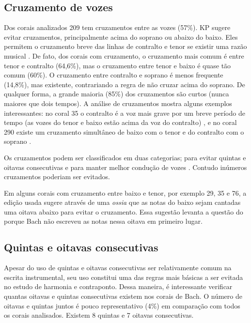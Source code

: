 \subsection{Cruzamento de vozes}
\label{sec:cruzamento-de-vozes}

Dos corais analizados 209 tem cruzamentos entre as vozes (57\%). KP
sugere evitar cruzamentos, principalmente acima do soprano ou abaixo
do baixo. Eles permitem o cruzamento breve das linhas de contralto e
tenor se existir uma razão musical \cite[p. 79]{kostka.ea00:tonal}. De
fato, dos corais com cruzamento, o cruzamento mais comum é entre tenor
e contralto (64,6\%), mas o cruzamento entre tenor e baixo é quase tão
comum (60\%). O cruzamento entre contralto e soprano é menos frequente
(14,8\%), mas existente, contrariando a regra de não cruzar acima do
soprano. De qualquer forma, a grande maioria (85\%) dos cruzamentos
são curtos (nunca maiores que dois tempos). A análise de cruzamentos
mostra alguns exemplos interessantes: no coral 35 o contralto é a voz
mais grave por um breve período de tempo (as vozes do tenor e baixo
estão acima da voz do contralto) , e no coral 290 existe um
cruzamento simultâneo de baixo com o tenor e do contralto com o
soprano .


Os cruzamentos podem ser classificados em duas categorias; para evitar
quintas e oitavas consecutivas  e para manter melhor
condução de vozes . Contudo inúmeros cruzamentos poderiam
ser evitados. 

Em alguns corais com cruzamento entre baixo e tenor, por exemplo 29,
35 e 76, a edição usada sugere através de uma \textit{ossia} que as
notas do baixo sejam cantadas uma oitava abaixo para evitar o
cruzamento. Essa sugestão levanta a questão do porque Bach não
escreveu as notas nessa oitava em primeiro lugar.

\subsection{Quintas e oitavas consecutivas}
\label{sec:quintas-e-oitavas}

Apesar do uso de quintas e oitavas consecutivas ser relativamente
comum na escrita instrumental, seu uso constitui uma das regras mais
básicas a ser evitada no estudo de harmonia e contraponto. Dessa
maneira, é interessante verificar quantas oitavas e quintas
consecutivas existem nos corais de Bach. O número de oitavas e quintas
juntos é pouco representativo (4\%) em comparação com todos os corais
analisados. Existem 8 quintas e 7 oitavas consecutivas.


